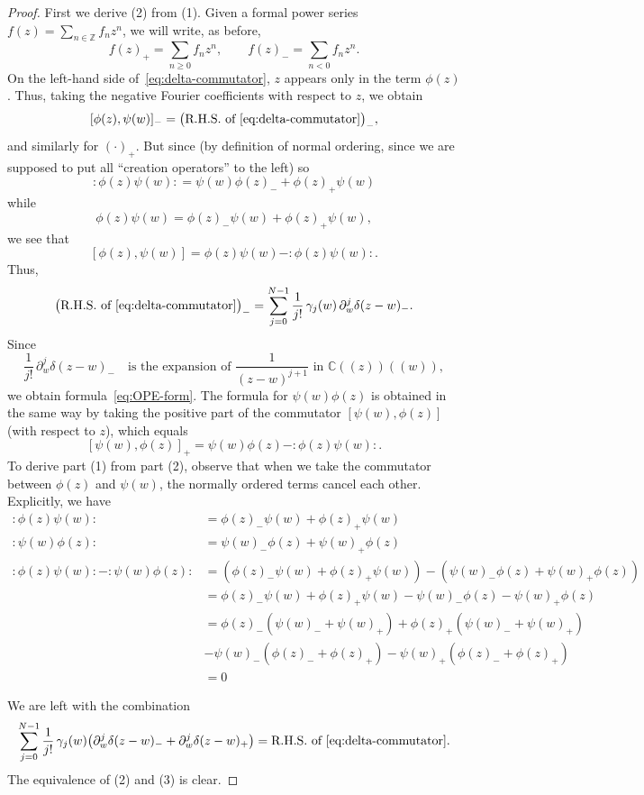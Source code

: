 \documentclass[12pt]{article}
\begin{document}
\begin{proof}
First we derive (2) from (1).
Given a formal power series $f(z)=\sum_{n\in\mathbb{Z}} f_n z^n$, 
we will write, as before,
\[
f(z)_+ = \sum_{n\ge 0} f_n z^n,
\qquad
f(z)_- = \sum_{n<0} f_n z^n.
\]
On the left-hand side of~\eqref{eq:delta-commutator}, 
$z$ appears only in the term $\phi(z)$. 
Thus, taking the negative Fourier coefficients with respect to $z$, we obtain
\[
[\phi(z),\psi(w)]_- = 
\big(\text{R.H.S. of~\eqref{eq:delta-commutator}}\big)_-,
\]
and similarly for $(\cdot)_+$.
But since (by definition of normal ordering, since we are supposed to put all “creation operators” to the left) so 
\[
:\phi(z)\psi(w): 
= \psi(w)\phi(z)_- + \phi(z)_+\psi(w)
\]
while 
\[
\phi(z)\psi(w) = \phi(z)_-\psi(w) + \phi(z)_+\psi(w),
\]
we see that
\[
[\phi(z),\psi(w)] = 
\phi(z)\psi(w) - :\phi(z)\psi(w):.
\]
Thus,
\[
\big(\text{R.H.S. of~\eqref{eq:delta-commutator}}\big)_-
= \sum_{j=0}^{N-1} \frac{1}{j!}\,\gamma_j(w)\,
\partial_w^j \delta(z-w)_-.
\]
Since
\[
\frac{1}{j!}\,\partial_w^j \delta(z-w)_-
\quad \text{is the expansion of } 
\frac{1}{(z-w)^{j+1}}
\text{ in } \mathbb{C}((z))((w)),
\]
we obtain formula~\eqref{eq:OPE-form}.
The formula for $\psi(w)\phi(z)$ is obtained in the same way
by taking the positive part of the commutator $[\psi(w),\phi(z)]$ 
(with respect to $z$), which equals
\[
[\psi(w),\phi(z)]_+ = \psi(w)\phi(z) - :\phi(z)\psi(w):.
\]
To derive part (1) from part (2), observe that when we take the commutator
between $\phi(z)$ and $\psi(w)$, the normally ordered terms cancel each other. Explicitly, we have
\begin{align*}
:\phi(z)\psi(w):
&= \phi(z)_- \psi(w) + \phi(z)_+ \psi(w) \\
:\psi(w)\phi(z):
&= \psi(w)_- \phi(z) + \psi(w)_+ \phi(z) \\
:\phi(z)\psi(w): - :\psi(w)\phi(z): &= (\phi(z)_- \psi(w) + \phi(z)_+ \psi(w)) - (\psi(w)_- \phi(z) + \psi(w)_+ \phi(z)) \\
&= \phi(z)_- \psi(w) + \phi(z)_+ \psi(w) - \psi(w)_- \phi(z) - \psi(w)_+ \phi(z) \\
&= \phi(z)_- (\psi(w)_- + \psi(w)_+) + \phi(z)_+ (\psi(w)_- + \psi(w)_+) \\
&- \psi(w)_- (\phi(z)_- + \phi(z)_+) - \psi(w)_+ (\phi(z)_- + \phi(z)_+) \\
&= 0
\end{align*}

We are left with the combination
\[
\sum_{j=0}^{N-1} \frac{1}{j!}\,\gamma_j(w)
\big(\partial_w^j \delta(z-w)_- + \partial_w^j \delta(z-w)_+\big)
= \text{R.H.S. of~\eqref{eq:delta-commutator}}.
\]
The equivalence of (2) and (3) is clear.
\end{proof}
\end{document}
